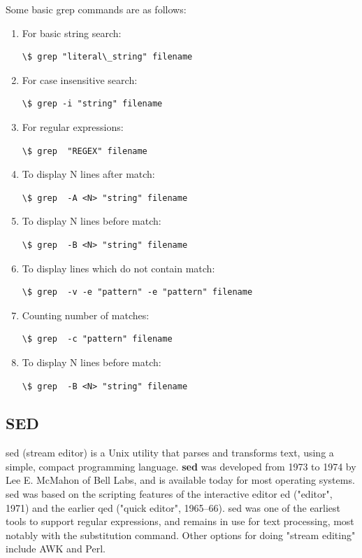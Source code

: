 \documentclass{article}
\begin{document}
Some basic grep commands are as follows:
\begin{enumerate}
    \item
        For basic string search:
        \begin{lstlisting}[style=BashInputStyle]
            \$ grep "literal\_string" filename
        \end{lstlisting}
    \item
        For case insensitive search:
        \begin{lstlisting}[style=BashInputStyle]
            \$ grep -i "string" filename
        \end{lstlisting}
    \item
        For regular expressions:
        \begin{lstlisting}[style=BashInputStyle]
            \$ grep  "REGEX" filename
        \end{lstlisting}
    \item
        To display N lines after match:
        \begin{lstlisting}[style=BashInputStyle]
            \$ grep  -A <N> "string" filename
        \end{lstlisting}
    \item
        To display N lines before match:
        \begin{lstlisting}[style=BashInputStyle]
            \$ grep  -B <N> "string" filename
        \end{lstlisting}
    \item
        To display lines which do not contain match:
        \begin{lstlisting}[style=BashInputStyle]
            \$ grep  -v -e "pattern" -e "pattern" filename
        \end{lstlisting}
    \item
        Counting number of matches:
        \begin{lstlisting}[style=BashInputStyle]
            \$ grep  -c "pattern" filename
        \end{lstlisting}
    \item
        To display N lines before match:
        \begin{lstlisting}[style=BashInputStyle]
            \$ grep  -B <N> "string" filename
        \end{lstlisting}
\end{enumerate}
    \subsection{SED}
    sed (stream editor) is a Unix utility that parses and transforms text, using a simple, compact programming language. \textbf{sed} was developed from 1973 to 1974 by Lee E. McMahon of Bell Labs, and is available today for most operating systems. sed was based on the scripting features of the interactive editor ed ("editor", 1971) and the earlier qed ("quick editor", 1965–66). sed was one of the earliest tools to support regular expressions, and remains in use for text processing, most notably with the substitution command. Other options for doing "stream editing" include AWK and Perl.
\end{document}
